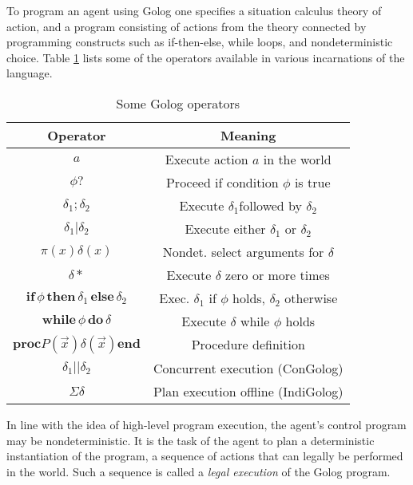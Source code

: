 \documentclass[times, 10pt, twocolumn]{article}
\providecommand{\tabularnewline}{\\}
\begin{document}
To program an agent using Golog one specifies a situation calculus
theory of action, and a program consisting of actions from the theory
connected by programming constructs such as if-then-else, while loops,
and nondeterministic choice. Table \ref{tbl:Golog-Operators} lists
some of the operators available in various incarnations of the language.%
\begin{table}
\caption{Some Golog operators\label{tbl:Golog-Operators}}
\begin{centering}\begin{tabular}{|c|c|}
\hline 
Operator&
Meaning\tabularnewline
\hline
\hline 
$a$&
Execute action $a$ in the world\tabularnewline
\hline 
$\phi?$&
Proceed if condition $\phi$ is true\tabularnewline
\hline 
$\delta_{1};\delta_{2}$&
Execute $\delta_{1}$followed by $\delta_{2}$\tabularnewline
\hline 
$\delta_{1}|\delta_{2}$&
Execute either $\delta_{1}$ or $\delta_{2}$\tabularnewline
\hline 
$\pi(x)\delta(x)$&
Nondet. select arguments for $\delta$\tabularnewline
\hline 
$\delta*$&
Execute $\delta$ zero or more times\tabularnewline
\hline 
$\mathbf{if}\,\phi\,\mathbf{then}\,\delta_{1}\,\mathbf{else}\,\delta_{2}$&
Exec. $\delta_{1}$ if $\phi$ holds, $\delta_{2}$ otherwise\tabularnewline
\hline 
$\mathbf{while\,}\phi\mathbf{\, do}\,\delta$&
Execute $\delta$ while $\phi$ holds\tabularnewline
\hline 
$\mathbf{proc}P(\overrightarrow{x})\delta(\overrightarrow{x})\mathbf{end}$&
Procedure definition\tabularnewline
\hline 
$\delta_{1}||\delta_{2}$&
Concurrent execution (ConGolog)\tabularnewline
\hline 
$\Sigma\delta$&
Plan execution offline (IndiGolog)\tabularnewline
\hline
\end{tabular}\par\end{centering}
\end{table}

In line with the idea of high-level program execution, the agent's
control program may be nondeterministic. It is the task of the agent
to plan a deterministic instantiation of the program, a sequence of
actions that can legally be performed in the world. Such a sequence
is called a \emph{legal execution} of the Golog program.
\end{document}
